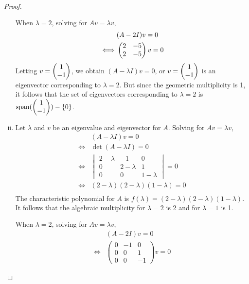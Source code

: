 \begin{proof}
\begin{enumerate}[(i)]
              When $\lambda=2$, solving for $Av=\lambda v$,
              \[
                  \begin{aligned}
                       & (A-2I)v=0                   \\
                      \iff
                       & \begin{pmatrix} 2 &-5\\ 2 &-5 \end{pmatrix}v=0
                  \end{aligned}
              \]
              Letting $v=\begin{pmatrix} 1\\ -1\end{pmatrix}$, we obtain $(A-\lambda I)v=0$, or $v=\begin{pmatrix} 1\\ -1\end{pmatrix}$ is an eigenvector corresponding to $\lambda=2$.
              But since the geometric multiplicity is 1, it follows that the set of eigenvectors corresponding to $\lambda=2$ is $\textnormal{span}(\begin{pmatrix} 1\\ -1\end{pmatrix})-\{0\}$.
        \item Let $\lambda$ and $v$ be an eigenvalue and eigenvector for $A$.
              Solving for $Av=\lambda v$,
              \[
                  \begin{aligned}
                       & (A-\lambda I)v=0                    \\
                      \iff
                       & \det(A-\lambda I)=0                 \\
                      \iff
                       & \begin{vmatrix}
                             2-\lambda & -1        & 0         \\
                             0         & 2-\lambda & 1         \\
                             0         & 0         & 1-\lambda
                         \end{vmatrix}=0   \\
                      \iff
                       & (2-\lambda)(2-\lambda)(1-\lambda)=0 \\
                  \end{aligned}
              \]
              The characteristic polynomial for $A$ is $f(\lambda)=(2-\lambda)(2-\lambda)(1-\lambda)$.
              It follows that the algebraic multiplicity for $\lambda=2$ is 2 and for $\lambda=1$ is 1.

              When $\lambda=2$, solving for $Av=\lambda v$,
              \[
                  \begin{aligned}
                       & (A-2I)v=0                    \\
                      \iff
                       & \begin{pmatrix}
                            0 & -1 & 0\\
                            0 & 0 & 1\\
                            0 & 0 & -1
                       \end{pmatrix}v=0
                  \end{aligned}
              \]
                


\end{enumerate}
\end{proof}
